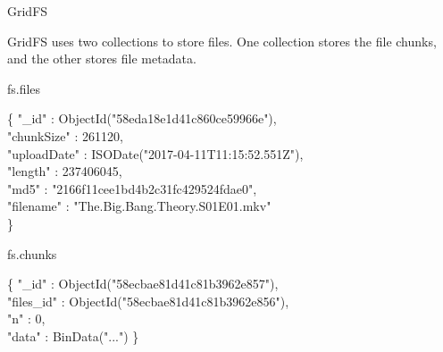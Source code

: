 \documentclass{beamer}
\begin{document}
\begin{frame}{GridFS}
	\begin{minipage}[t]{\textwidth}
		GridFS\cite{Chodorow2013MongoDB} uses two collections to store files. One collection stores the file chunks, and the other stores file metadata.
	\end{minipage}
    
    \begin{block}{fs.files}
        \scriptsize
        \begin{Alms*}
            \{ \NI
                "\_id" : ObjectId("58eda18e1d41c860ce59966e"), \\
                "chunkSize" : 261120, \\
                "uploadDate" : ISODate("2017-04-11T11:15:52.551Z"), \\
                "length" : 237406045, \\
                "md5" : "2166f11cee1bd4b2c31fc429524fdae0", \\
                "filename" : "The.Big.Bang.Theory.S01E01.mkv" \\
            \ND \}
        \end{Alms*}
    \end{block}
    
    \begin{block}{fs.chunks}
        \scriptsize
        \begin{Alms*}
            \{ \NI
            "\_id" : ObjectId("58ecbae81d41c81b3962e857"), \\
            "files\_id" : ObjectId("58ecbae81d41c81b3962e856"), \\
            "n" : 0, \\
            "data" : BinData("...")
            \ND \}
         \end{Alms*}
    \end{block}
    
\end{frame}
\end{document}
